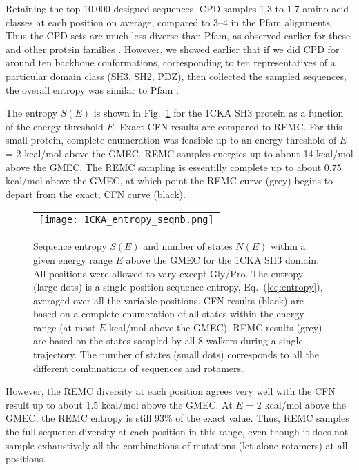 {{Retaining the top 10,000 designed sequences, CPD samples 1.3 to 1.7 amino acid classes at each position on average,
compared to 3--4 in the Pfam alignments. Thus the CPD sets are much less diverse than Pfam, as observed earlier for
these and other protein families \cite{Schmidt09,Schmidt10}. However, we showed earlier that if we did CPD for around
ten backbone conformations, corresponding to ten representatives of a particular domain class (SH3, SH2, PDZ), then
collected the sampled sequences, the overall entropy was similar to Pfam \cite{Schmidt09,Schmidt10}. 

The entropy $S(E)$ is shown in Fig.\ \ref{fig:entropy} for the 1CKA SH3 protein as a function of the energy threshold $E$.
Exact CFN results are compared to REMC. For this small protein, complete enumeration was feasible up to an energy threshold
of $E$ = 2 kcal/mol above the GMEC. REMC samples energies up to about 14 kcal/mol above the GMEC. The REMC sampling is
essentilly complete up to about 0.75 kcal/mol above the GMEC, at which point the REMC curve (grey) begins to depart from
the exact, CFN curve (black).


    \begin{figure}[!htbp]
      \centering
      \begin{tabular}{c}
        \texttt{[image: 1CKA\_entropy\_seqnb.png]} 
      \end{tabular}

\caption[width=1cm]{\small 
Sequence entropy $S(E)$ and number of states $N(E)$ within a given energy range $E$ above the GMEC for the 1CKA
SH3 domain. All positions were allowed to vary except Gly/Pro. The entropy (large dots) is a single position
sequence entropy, Eq.\ (\ref{eq:entropy}), averaged over all the variable positions. CFN results (black) are based
on a complete enumeration of all states within the energy range (at most $E$ kcal/mol above the GMEC). REMC results
(grey) are based on the states sampled by all 8 walkers during a single trajectory. The number of states (small dots)
corresponds to all the different combinations of sequences and rotamers.
}
       \label{fig:entropy}
    \end{figure}




However, the REMC diversity at each position agrees very well with the CFN result up to
about 1.5 kcal/mol above the GMEC. At $E$ = 2 kcal/mol above the GMEC, the REMC entropy is still 93\% of the exact value.
Thus, REMC samples the full sequence diversity at each position in this range, even though it does not sample exhaustively
all the combinations of mutations (let alone rotamers) at all positions.

}}
